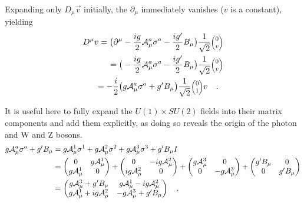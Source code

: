     Expanding only $D_{\mu} \vec{v}$ initially, the $\partial_{\mu}$ immediately vanishes ($v$ is a constant), yielding 
    \begin{equation} \begin{split}
        D^{\mu} v  = \big( \partial^{\mu} & - \frac{ig}{2} \wField^a_{\mu} \sigma^a - \frac{ig'}{2} B_{\mu} \big) \frac{1}{\sqrt{2}}\minimatrix{0\\v} \\
        = \big( & - \frac{ig}{2} \wField^a_{\mu} \sigma^a - \frac{ig'}{2} B_{\mu} \big) \frac{1}{\sqrt{2}}\minimatrix{0\\v} \\
        = - \frac{i}{2} \big( & g \wField^a_{\mu} \sigma^a + g' B_{\mu} \big) \frac{1}{\sqrt{2}}\minimatrix{0\\1} v
        \quad.
    \end{split} \end{equation}

    It is useful here to fully expand the $U(1) \times SU(2)$ fields into their matrix components and add them explicitly,
        as doing so reveals the origin of the photon and W and Z bosons.
    \begin{equation} \begin{split}
        g \mathcal{A}^a_{\mu} \sigma^a + g' B_{\mu} & =
            g \mathcal{A}^1_{\mu} \sigma^1
            + g \mathcal{A}^2_{\mu} \sigma^2
            + g \mathcal{A}^3_{\mu} \sigma^3
            + g' B_{\mu} I \\
        & = \begin{pmatrix}
            0 & g\mathcal{A}^1_{\mu} \\ g\mathcal{A}^1_{\mu} & 0 \end{pmatrix}
            + \begin{pmatrix} 0 & -ig\mathcal{A}^2_{\mu} \\ ig\mathcal{A}^2_{\mu} & 0 \end{pmatrix}
            + \begin{pmatrix} g\mathcal{A}^3_{\mu} & 0 \\ 0 & -g\mathcal{A}^3_{\mu} \end{pmatrix}
            + \begin{pmatrix} g'B_{\mu} & 0 \\ 0 & g'B_{\mu}
        \end{pmatrix} \\
        & = \begin{pmatrix} 
            g\mathcal{A}^3_{\mu} + g'B_{\mu} & g\mathcal{A}^1_{\mu} - ig\mathcal{A}^2_{\mu} \\
            g\mathcal{A}^1_{\mu} + ig\mathcal{A}^2_{\mu} & -g\mathcal{A}^3_{\mu} + g'B_{\mu}
        \end{pmatrix}
        \quad.
    \end{split} \end{equation}

